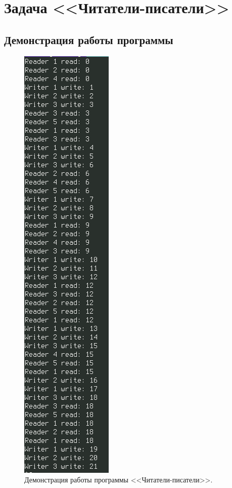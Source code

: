 \documentclass[12pt]{report}
\begin{document}
\chapter{Задача <<Читатели-писатели>>}

\section{Демонстрация работы программы}

\begin{figure}[H]
	\centering
	\includegraphics[scale=0.55]{img/read-write.png}
	\caption{Демонстрация работы программы <<Читатели-писатели>>.}
	\label{fig:task02}
\end{figure}
\end{document}
